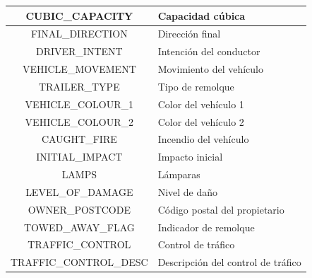 \begin{table}[H]
\begin{center}
\begin{tabular}{|c|l|}
			CUBIC\_CAPACITY & Capacidad cúbica \\ \hline
			FINAL\_DIRECTION & Dirección final \\ \hline
			DRIVER\_INTENT & Intención del conductor \\ \hline
			VEHICLE\_MOVEMENT & Movimiento del vehículo \\ \hline
			TRAILER\_TYPE & Tipo de remolque \\ \hline
			VEHICLE\_COLOUR\_1 & Color del vehículo 1 \\ \hline
			VEHICLE\_COLOUR\_2 & Color del vehículo 2 \\ \hline
			CAUGHT\_FIRE & Incendio del vehículo \\ \hline
			INITIAL\_IMPACT & Impacto inicial \\ \hline
			LAMPS & Lámparas \\ \hline
			LEVEL\_OF\_DAMAGE & Nivel de daño \\ \hline
			OWNER\_POSTCODE & Código postal del propietario \\ \hline
			TOWED\_AWAY\_FLAG & Indicador de remolque \\ \hline
			TRAFFIC\_CONTROL & Control de tráfico \\ \hline
			TRAFFIC\_CONTROL\_DESC & Descripción del control de tráfico \\ \hline
		\end{tabular}
	\end{center}

	\label{Victoria_VEHICLE_TABLE}
\end{table} 

